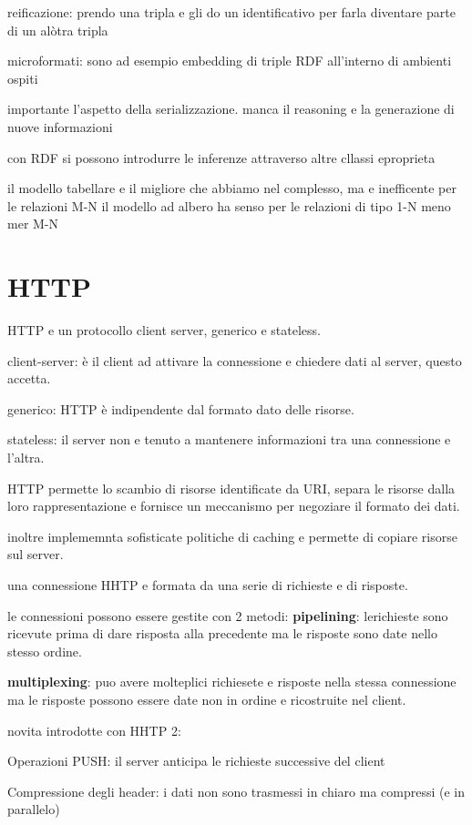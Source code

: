 \documentclass[12pt]{article}
\begin{document}
    reificazione: prendo una tripla e gli do un identificativo per farla diventare parte di un alòtra tripla


    microformati: sono ad esempio embedding di triple RDF all'interno di ambienti ospiti

    importante l'aspetto della serializzazione.
    manca il reasoning  e la generazione di nuove informazioni

    con RDF si possono introdurre le inferenze attraverso altre cllassi eproprieta

    il modello tabellare e il migliore che abbiamo nel complesso, ma e inefficente per le relazioni M-N
    il modello ad albero ha senso per le relazioni di tipo 1-N meno mer M-N

    \section{HTTP}

    HTTP e un protocollo client server, generico e stateless.

    client-server: è il client ad attivare la connessione e chiedere dati al server, questo accetta.

    generico: HTTP è indipendente dal formato dato delle risorse.

    stateless: il server non e tenuto a mantenere informazioni tra una connessione e l'altra.

    HTTP permette lo scambio di risorse identificate da URI, separa le risorse dalla loro rappresentazione e fornisce un meccanismo per negoziare il formato dei dati.
    
    inoltre implememnta sofisticate politiche di caching e  permette di copiare risorse sul server.

    una connessione HHTP e formata da una serie di richieste e di risposte.

le connessioni possono essere gestite con 2 metodi:
\textbf{pipelining}: lerichieste sono ricevute prima di dare risposta alla precedente ma le risposte sono date nello stesso ordine.

\textbf{multiplexing}: puo avere molteplici richiesete e risposte nella stessa connessione ma le risposte possono essere date non in ordine e ricostruite nel client.

novita introdotte con HHTP 2:

Operazioni PUSH: il server anticipa le richieste successive del client

Compressione degli header: i dati non sono trasmessi in chiaro ma
compressi (e in parallelo)
\end{document}
